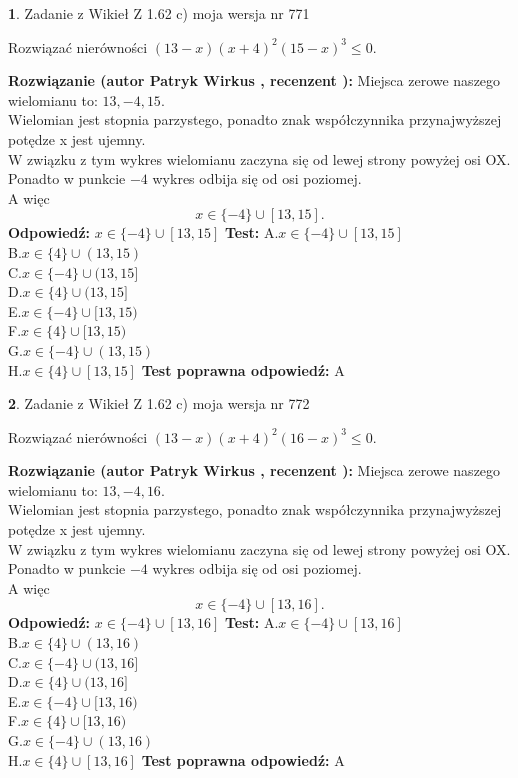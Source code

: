 \documentclass[12pt, a4paper]{article}
\theoremstyle{definition} %
\newtheorem{zad}{}
\newcommand{\zadStart}[1]{\begin{zad}#1\newline}
\newcommand{\zadStop}{\end{zad}}
\newcommand{\rozwStart}[2]{\noindent \textbf{Rozwiązanie (autor #1 , recenzent #2): }\newline}
\newcommand{\rozwStop}{\newline}
\newcommand{\odpStart}{\noindent \textbf{Odpowiedź:}\newline}
\newcommand{\odpStop}{\newline}
\newcommand{\testStart}{\noindent \textbf{Test:}\newline}
\newcommand{\testStop}{\newline}
\newcommand{\kluczStart}{\noindent \textbf{Test poprawna odpowiedź:}\newline}
\newcommand{\kluczStop}{\newline}
\begin{document}
\zadStart{Zadanie z Wikieł Z 1.62 c) moja wersja nr 771}

Rozwiązać nierówności $(13-x)(x+4)^{2}(15-x)^{3}\le0$.
\zadStop
\rozwStart{Patryk Wirkus}{}
Miejsca zerowe naszego wielomianu to: $13, -4, 15$.\\
Wielomian jest stopnia parzystego, ponadto znak współczynnika przy\linebreak najwyższej potędze x jest ujemny.\\ W związku z tym wykres wielomianu zaczyna się od lewej strony powyżej osi OX.\\
Ponadto w punkcie $-4$ wykres odbija się od osi poziomej.\\
A więc $$x \in \{-4\} \cup [13,15].$$
\rozwStop
\odpStart
$x \in \{-4\} \cup [13,15]$
\odpStop
\testStart
A.$x \in \{-4\} \cup [13,15]$\\
B.$x \in \{4\} \cup (13,15)$\\
C.$x \in \{-4\} \cup (13,15]$\\
D.$x \in \{4\} \cup (13,15]$\\
E.$x \in \{-4\} \cup [13,15)$\\
F.$x \in \{4\} \cup [13,15)$\\
G.$x \in \{-4\} \cup (13,15)$\\
H.$x \in \{4\} \cup [13,15]$
\testStop
\kluczStart
A
\kluczStop



\zadStart{Zadanie z Wikieł Z 1.62 c) moja wersja nr 772}

Rozwiązać nierówności $(13-x)(x+4)^{2}(16-x)^{3}\le0$.
\zadStop
\rozwStart{Patryk Wirkus}{}
Miejsca zerowe naszego wielomianu to: $13, -4, 16$.\\
Wielomian jest stopnia parzystego, ponadto znak współczynnika przy\linebreak najwyższej potędze x jest ujemny.\\ W związku z tym wykres wielomianu zaczyna się od lewej strony powyżej osi OX.\\
Ponadto w punkcie $-4$ wykres odbija się od osi poziomej.\\
A więc $$x \in \{-4\} \cup [13,16].$$
\rozwStop
\odpStart
$x \in \{-4\} \cup [13,16]$
\odpStop
\testStart
A.$x \in \{-4\} \cup [13,16]$\\
B.$x \in \{4\} \cup (13,16)$\\
C.$x \in \{-4\} \cup (13,16]$\\
D.$x \in \{4\} \cup (13,16]$\\
E.$x \in \{-4\} \cup [13,16)$\\
F.$x \in \{4\} \cup [13,16)$\\
G.$x \in \{-4\} \cup (13,16)$\\
H.$x \in \{4\} \cup [13,16]$
\testStop
\kluczStart
A
\kluczStop
\end{document}
